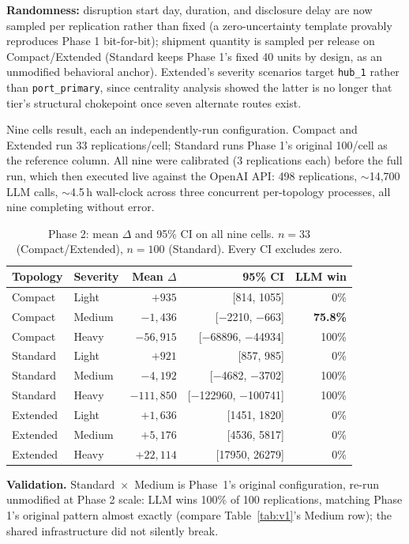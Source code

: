 \documentclass[10pt,twocolumn]{article}
\begin{document}
\textbf{Randomness:} disruption start day, duration, and disclosure delay are now sampled per replication rather than fixed (a zero-uncertainty template provably reproduces Phase 1 bit-for-bit); shipment quantity is sampled per release on Compact/Extended (Standard keeps Phase 1's fixed 40 units by design, as an unmodified behavioral anchor). Extended's severity scenarios target \texttt{hub\_1} rather than \texttt{port\_primary}, since centrality analysis showed the latter is no longer that tier's structural chokepoint once seven alternate routes exist.

Nine cells result, each an independently-run configuration. Compact and Extended run 33 replications/cell; Standard runs Phase 1's original 100/cell as the reference column. All nine were calibrated (3 replications each) before the full run, which then executed live against the OpenAI API: 498 replications, $\sim$14{,}700 LLM calls, $\sim$4.5\,h wall-clock across three concurrent per-topology processes, all nine completing without error.

\begin{table}[t]
\centering
\small
\begin{tabular}{@{}llrrr@{}}
\toprule
Topology & Severity & Mean $\Delta$ & 95\% CI & LLM win \\
\midrule
Compact  & Light  & $+935$ & [814, 1055]      & 0\% \\
Compact  & Medium & $-1{,}436$ & [$-$2210, $-$663] & \textbf{75.8\%} \\
Compact  & Heavy  & $-56{,}915$ & [$-$68896, $-$44934] & 100\% \\
Standard & Light  & $+921$ & [857, 985]        & 0\% \\
Standard & Medium & $-4{,}192$ & [$-$4682, $-$3702] & 100\% \\
Standard & Heavy  & $-111{,}850$ & [$-$122960, $-$100741] & 100\% \\
Extended & Light  & $+1{,}636$ & [1451, 1820]    & 0\% \\
Extended & Medium & $+5{,}176$ & [4536, 5817]    & 0\% \\
Extended & Heavy  & $+22{,}114$ & [17950, 26279]  & 0\% \\
\bottomrule
\end{tabular}
\caption{Phase 2: mean $\Delta$ and 95\% CI on all nine cells. $n=33$ (Compact/Extended), $n=100$ (Standard). Every CI excludes zero.}
\label{tab:v2}
\end{table}

\textbf{Validation.} Standard~$\times$~Medium is Phase~1's original configuration, re-run unmodified at Phase 2 scale: LLM wins 100\% of 100 replications, matching Phase 1's original pattern almost exactly (compare Table~\ref{tab:v1}'s Medium row); the shared infrastructure did not silently break.
\end{document}
